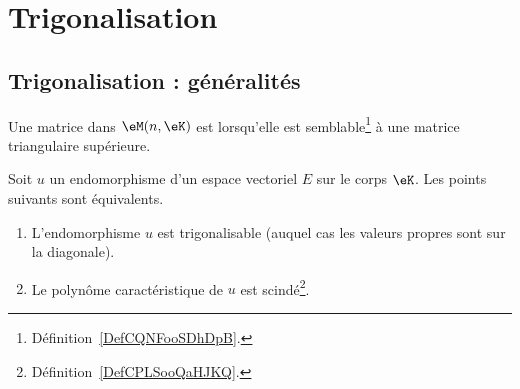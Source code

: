 \section{Trigonalisation}

\subsection{Trigonalisation : généralités}
\label{SUBSECooMCOGooEoQCsz}

\begin{definition}
	Une matrice dans \( \eM(n,\eK)\) est  lorsqu'elle est semblable\footnote{Définition~\ref{DefCQNFooSDhDpB}.} à une matrice triangulaire supérieure.
\end{definition}

\begin{proposition} \label{PropKNVFooQflQsJ}
	Soit \( u\) un endomorphisme d'un espace vectoriel \( E\) sur le corps \( \eK\). Les points suivants sont équivalents.
	\begin{enumerate}
		\item   \label{ItemZKDMooOrTHkwi}
		      L'endomorphisme \( u\) est trigonalisable (auquel cas les valeurs propres sont sur la diagonale).
		\item   \label{ItemZKDMooOrTHkwii}
		      Le polynôme caractéristique de \( u\) est scindé\footnote{Définition~\ref{DefCPLSooQaHJKQ}.}.
	\end{enumerate}
\end{proposition}

